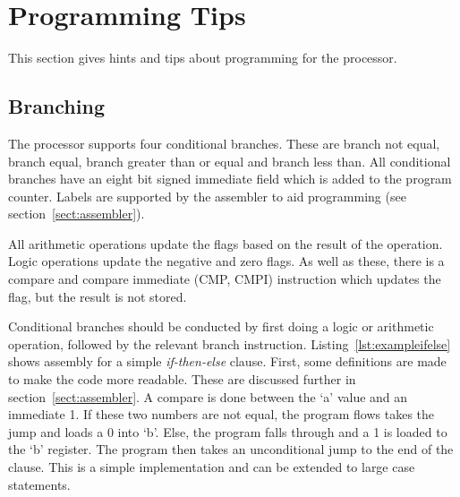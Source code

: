 
\section{Programming Tips}
{}



This section gives hints and tips about programming for the \samurai{} processor. 

\subsection{Branching}

The \samurai{} processor supports four conditional branches. %
These are branch not equal, branch equal, branch greater than or equal and branch less than. 
All conditional branches have an eight bit signed immediate field which is added to the program counter.
Labels are supported by the assembler to aid programming (see section~\ref{sect:assembler}).

All arithmetic operations update the flags based on the result of the operation. 
Logic operations update the negative and zero flags. 
As well as these, there is a compare and compare immediate (CMP, CMPI) instruction which updates the flag, but the result is not stored. 

Conditional branches should be conducted by first doing a logic or arithmetic operation, followed by the relevant branch instruction. 
Listing~\ref{lst:exampleifelse} shows assembly for a simple \textit{if-then-else} clause. 
First, some definitions are made to make the code more readable. 
These are discussed further in section~\ref{sect:assembler}.
A compare is done between the `a' value and an immediate 1. 
If these two numbers are not equal, the program flows takes the jump and loads a 0 into `b'.
Else, the program falls through and a 1 is loaded to the `b' register. 
The program then takes an unconditional jump to the end of the clause. 
This is a simple implementation and can be extended to large case statements.

